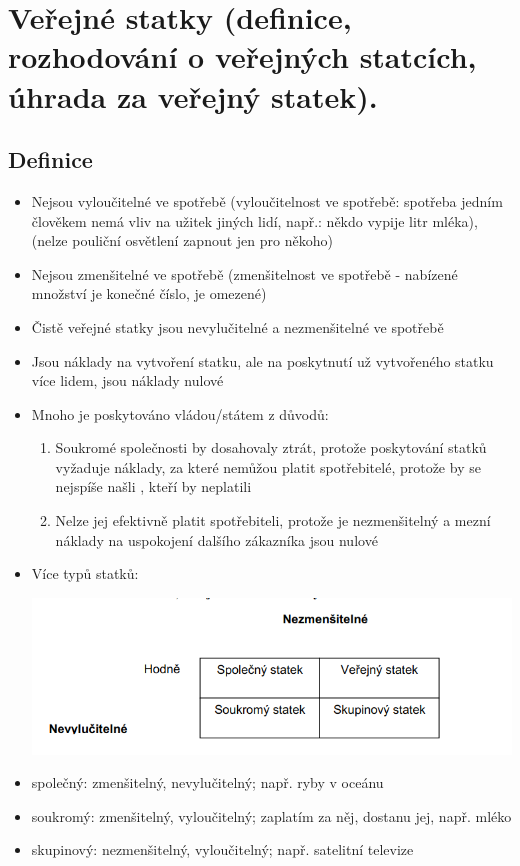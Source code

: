 \clearpage
\section{Veřejné statky (definice, rozhodování o veřejných statcích, úhrada za veřejný statek).}
\subsection{Definice}
\begin{itemize}
    \item Nejsou vyloučitelné ve spotřebě (vyloučitelnost ve spotřebě: spotřeba jedním člověkem nemá vliv 
    na užitek jiných lidí, např.: někdo vypije litr mléka), (nelze pouliční osvětlení zapnout jen pro někoho)
    \item Nejsou zmenšitelné ve spotřebě (zmenšitelnost ve spotřebě - nabízené množství je konečné číslo, je omezené)
    \item Čistě veřejné statky jsou nevylučitelné a nezmenšitelné ve spotřebě
    \item Jsou náklady na vytvoření statku, ale na poskytnutí už vytvořeného statku více lidem, jsou náklady nulové
    \item Mnoho je poskytováno vládou/státem z důvodů:
    \begin{enumerate}
        \item Soukromé společnosti by dosahovaly ztrát, protože poskytování statků vyžaduje náklady,
        za které nemůžou platit spotřebitelé, protože by se nejspíše našli , kteří by neplatili
        \item Nelze jej efektivně platit spotřebiteli, protože je nezmenšitelný a mezní náklady na uspokojení dalšího
        zákazníka jsou nulové
    \end{enumerate}
    \item Více typů statků:
    
    \includegraphics[width=15.5cm]{images/23_statky.png}
    
    \item společný: zmenšitelný, nevylučitelný; např. ryby v oceánu
    \item soukromý: zmenšitelný, vyloučitelný; zaplatím za něj, dostanu jej, např. mléko
    \item skupinový: nezmenšitelný, vyloučitelný; např. satelitní televize
\end{itemize}

